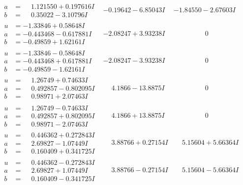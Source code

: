 \documentclass[1p]{elsarticle_modified}
\theoremstyle{definition}
\begin{document}
$$\begin{array}{c|c|c}
\begin{aligned}
a &= \phantom{-}1.121550 + 0.197616 I \\
b &= \phantom{-}0.35022 - 3.10796 I\end{aligned}
 & -0.19642 - 6.85043 I & -1.84550 - 2.67603 I \\ \hline\begin{aligned}
u &= -1.33846 + 0.58648 I \\
a &= -0.443468 - 0.617881 I \\
b &= -0.49859 + 1.62161 I\end{aligned}
 & -2.08247 + 3.93238 I & \phantom{-0.000000 } 0 \\ \hline\begin{aligned}
u &= -1.33846 - 0.58648 I \\
a &= -0.443468 + 0.617881 I \\
b &= -0.49859 - 1.62161 I\end{aligned}
 & -2.08247 - 3.93238 I & \phantom{-0.000000 } 0 \\ \hline\begin{aligned}
u &= \phantom{-}1.26749 + 0.74633 I \\
a &= \phantom{-}0.492857 - 0.802095 I \\
b &= \phantom{-}0.98971 + 2.07463 I\end{aligned}
 & \phantom{-}4.1866 - 13.8875 I & \phantom{-0.000000 } 0 \\ \hline\begin{aligned}
u &= \phantom{-}1.26749 - 0.74633 I \\
a &= \phantom{-}0.492857 + 0.802095 I \\
b &= \phantom{-}0.98971 - 2.07463 I\end{aligned}
 & \phantom{-}4.1866 + 13.8875 I & \phantom{-0.000000 } 0 \\ \hline\begin{aligned}
u &= \phantom{-}0.446362 + 0.272843 I \\
a &= \phantom{-}2.69827 - 1.07449 I \\
b &= \phantom{-}0.160409 + 0.341725 I\end{aligned}
 & \phantom{-}3.88766 + 0.27154 I & \phantom{-}5.15604 + 5.66364 I \\ \hline\begin{aligned}
u &= \phantom{-}0.446362 - 0.272843 I \\
a &= \phantom{-}2.69827 + 1.07449 I \\
b &= \phantom{-}0.160409 - 0.341725 I\end{aligned}
 & \phantom{-}3.88766 - 0.27154 I & \phantom{-}5.15604 - 5.66364 I \\ \hline\begin{aligned}

\end{aligned}
\end{array}$$
\end{document}
